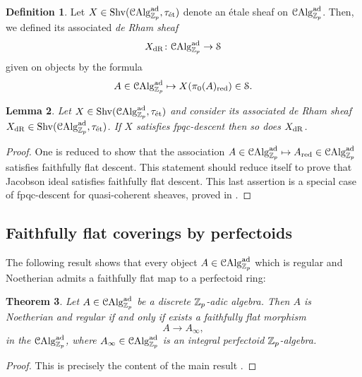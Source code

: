 \documentclass[10pt,a4paper]{amsart}
\numberwithin{equation}{subsection}
\newtheorem{theorem}{Theorem}[subsection]
\newtheorem{lemma}[theorem]{Lemma}
\theoremstyle{definition}
\newtheorem{definition}[theorem]{Definition}
\begin{document}
\begin{definition}
    Let $X \in \mathrm{Shv}(\mathcal C \mathrm{Alg}^{\mathrm{ad}}_{\mathbb Z_p}, \tau_{\text{\'et}})$ denote an \'etale sheaf on $\mathcal C \mathrm{Alg}^{\mathrm{ad}}_{\mathbb Z_p}$. Then, we defined its associated \emph{de Rham sheaf} 
        \[
            X_{\mathrm{dR}} \colon \mathcal C \mathrm{Alg}^{\mathrm{ad}}_{\mathbb Z_p} \to \mathcal S
        \]  
    given on objects by the formula
        \[
            A \in \mathcal C \mathrm{Alg}^{\mathrm{ad}}_{\mathbb Z_p} \mapsto X(\pi_0(A)_{\mathrm{red}}) \in \mathcal S. 
        \]
\end{definition}

\begin{lemma}
    Let $X \in \mathrm{Shv}(\mathcal C \mathrm{Alg}^{\mathrm{ad}}_{\mathbb Z_p}, \tau_{\text{\'et}})$ and consider its associated de Rham sheaf $X_{\mathrm{dR}} \in \mathrm{Shv}(\mathcal C \mathrm{Alg}^{\mathrm{ad}}_{\mathbb Z_p}, \tau_{\text{\'et}})$. If $X$ satisfies fpqc-descent then so does $X_{\mathrm{dR}}$.
\end{lemma}

\begin{proof}
    One is reduced to show that the association $A \in \mathcal C \mathrm{Alg}^{\mathrm{ad}}_{\mathbb Z_p} \mapsto A_{\mathrm{red}} \in \mathcal C \mathrm{Alg}^{\mathrm{ad}}_{\mathbb Z_p}$ satisfies faithfully flat descent. This statement should reduce itself to prove that Jacobson ideal satisfies faithfully flat descent. This last assertion is a special case of fpqc-descent for quasi-coherent sheaves, proved in \cite[\href{https://stacks.math.columbia.edu/tag/023R}{Tag 023R}]{stacks-project}. 
\end{proof}

\subsection{Faithfully flat coverings by perfectoids}
The following result shows that every object $A \in \mathcal C \mathrm{Alg}^{\mathrm{ad}}_{\mathbb Z_p}$ which is regular and Noetherian admits a faithfully flat map to a perfectoid ring:

\begin{theorem}
    Let $A \in \mathcal C \mathrm{Alg}^{\mathrm{ad}}_{\mathbb Z_p}$ be a discrete $\mathbb Z_p$-adic algebra. Then $A$ is Noetherian and regular if and only if exists a faithfully flat morphism
        \[
                A \to A_\infty  ,
        \]
    in the \infcat $\mathcal C \mathrm{Alg}^{\mathrm{ad}}_{\mathbb Z_p}$, where $A_\infty \in \mathcal C \mathrm{Alg}^{\mathrm{ad}}_{\mathbb Z_p}$ is an integral perfectoid $\mathbb Z_p$-algebra.
\end{theorem}

\begin{proof}
    This is precisely the content of the main result \cite[Theorem 4.7]{bhatt2019regular}.
\end{proof}
\end{document}
